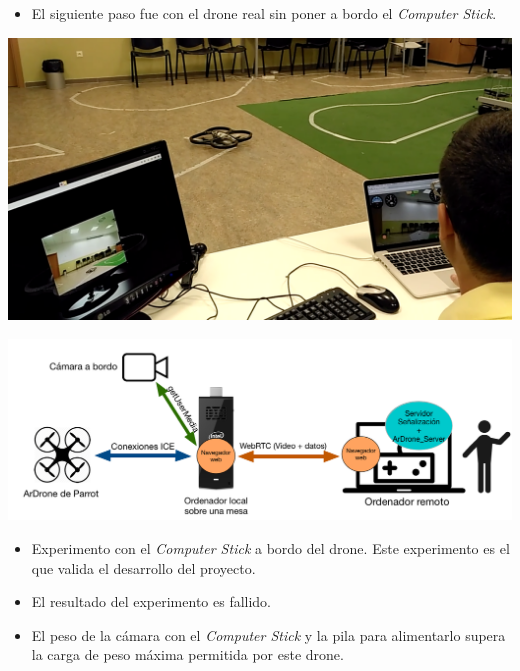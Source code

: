 \documentclass[notes,slidesec,a4]{seminar}
\begin{document}

\begin{hslide}
\begin{itemize}
\item El siguiente paso fue con el drone real sin poner a bordo el \emph{Computer Stick}.
\end{itemize}

\begin{minipage}[t]{0.3\textwidth}
\includegraphics[width=\textwidth]{img/experimentodronereal1}
\end{minipage}
\begin{minipage}[t]{0.7\textwidth}
\includegraphics[width=\textwidth]{img/esquema_experimento2}
\end{minipage}

\end{hslide}


\begin{hslide}
\begin{itemize}
\item Experimento con el \emph{Computer Stick} a bordo del drone. Este experimento es el que valida el desarrollo del proyecto.
\item El resultado del experimento es fallido.
\item El peso de la cámara con el \emph{Computer Stick} y la pila para alimentarlo supera la carga de peso máxima permitida por este drone.
\end{itemize}
\end{hslide}
\end{document}
